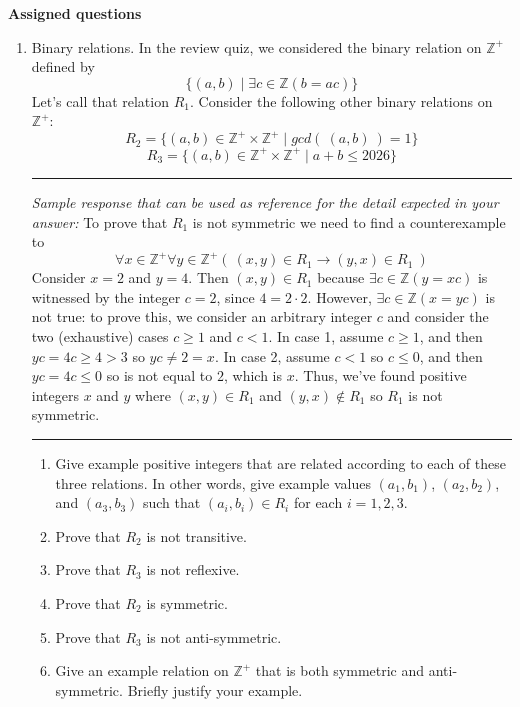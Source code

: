\newpage

{\bf Assigned questions}

\begin{enumerate}[labelindent=0pt, leftmargin=0pt]
    \item Binary relations. In the review quiz, we considered the binary relation on 
    $\mathbb{Z}^+$ defined by 
    \[\{(a,b) \mid \exists c \in \mathbb{Z}(b = ac)\}
    \]
    Let's call that relation $R_1$.
    Consider the following other binary relations on $\mathbb{Z}^{+}$:
    \[
    R_2 = \{ (a,b) \in \mathbb{Z}^+ \times \mathbb{Z}^+ \mid gcd (~ (a,b) ~) = 1\}    
    \]
    \[
    R_3 = \{ (a,b) \in \mathbb{Z}^+ \times \mathbb{Z}^+ \mid a+b \leq 2026\}    
    \]


    \rule{0.5\textwidth}{.4pt}
    
    {\it Sample response that can be used as reference for the detail expected 
    in your answer:} 
    To prove that $R_1$ is not symmetric we need to find a counterexample 
    to 
    \[
        \forall x \in \mathbb{Z}^+ \forall y \in \mathbb{Z}^+ \left(~(x,y) \in R_1 \to (y,x) \in R_1 ~\right)
    \]
    Consider $x = 2$ and $y=4$. Then $(x,y) \in R_1$ because $\exists c \in \mathbb{Z} ( y = xc )$ is witnessed
    by the integer $c = 2$, since $4 = 2 \cdot 2$. However, $\exists c  \in \mathbb{Z} ( x = yc )$ is not
    true: to prove this, we consider an arbitrary integer $c$ and consider the two 
    (exhaustive) cases $c \geq 1$ and $c < 1$. 
    In case 1,
    assume $c \geq 1$, and then $yc = 4c \geq 4 > 3$ so $yc \neq 2 = x$. In case 2, assume $c < 1$ so $c \leq 0$,
    and then $yc = 4c \leq 0$ so is not equal to $2$, which is $x$. Thus, we've found positive integers 
    $x$ and $y$ where $(x,y) \in R_1$ and $(y,x) \notin R_1$ so $R_1$ is not symmetric.

    \rule{0.5\textwidth}{.4pt}
    


    \begin{enumerate}
        \item Give example positive integers that are related
        according to each of these three relations. In other words, give 
        example values $(a_1, b_1)$, $(a_2, b_2)$, and $(a_3, b_3)$ such that
        $(a_i, b_i) \in R_i$ for each $i =1,2,3$.
        \item Prove that $R_2$ is not transitive.
        \item Prove that $R_3$ is not reflexive.
        \item Prove that $R_2$ is symmetric. 
        \item Prove that $R_3$ is not anti-symmetric.
        \item Give an example relation on $\mathbb{Z}^+$ that is both symmetric and anti-symmetric.
        Briefly justify your example.
        \end{enumerate}
    


\end{enumerate}
